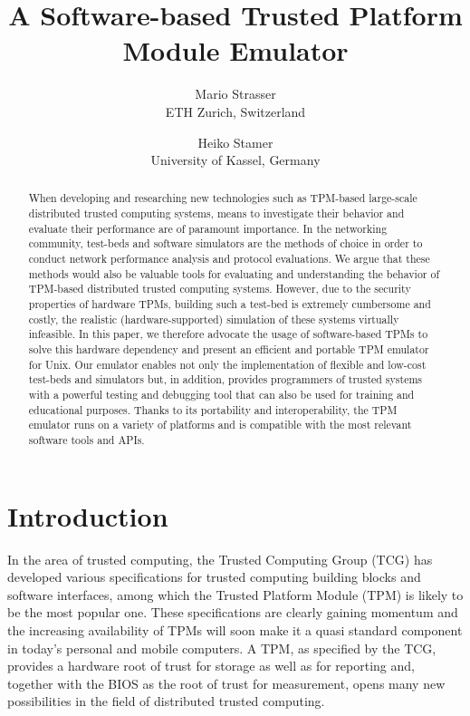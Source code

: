 \documentclass[11pt,letterpaper]{article}
\title{\vspace*{-1cm}\bfseries\textsf{A Software-based Trusted Platform Module Emulator}}
\author{
  Mario Strasser\\ETH Zurich, Switzerland
\and
  Heiko Stamer\\University of Kassel, Germany
}
\date{}
\begin{document}
\maketitle

\begin{abstract}
When developing and researching new technologies such as TPM-based large-scale distributed trusted
computing systems, means to investigate their behavior and evaluate their performance are of
paramount importance. In the networking community, test-beds and software simulators are the methods
of choice in order to conduct network performance analysis and protocol evaluations. We argue that
these methods would also be valuable tools for evaluating and understanding the behavior of
TPM-based distributed trusted computing systems. However, due to the security properties of hardware
TPMs, building such a test-bed is extremely cumbersome and costly, the realistic (hardware-supported)
simulation of these systems virtually infeasible. In this paper, we therefore advocate the usage of
software-based TPMs to solve this hardware dependency and present an efficient and portable TPM
emulator for Unix. Our emulator enables not only the implementation of flexible and low-cost
test-beds and simulators but, in addition, provides programmers of trusted systems with a powerful
testing and debugging tool that can also be used for training and educational purposes. Thanks to
its portability and interoperability, the TPM emulator runs on a variety of platforms and is
compatible with the most relevant software tools and APIs.
\end{abstract}


\section{Introduction}
In the area of trusted computing, the Trusted Computing Group (TCG) \cite{TCG} has developed
various specifications for trusted computing building blocks and software interfaces, among which
the Trusted Platform Module (TPM) \cite{TCGSpec} is likely to be the most popular one. These
specifications are clearly gaining momentum and the increasing availability of TPMs will soon make
it a quasi standard component in today's personal and mobile computers. A TPM, as specified by the
TCG, provides a hardware root of trust for storage as well as for reporting and, together with
the BIOS as the root of trust for measurement, opens many new possibilities in the field of
distributed trusted computing.
\end{document}
